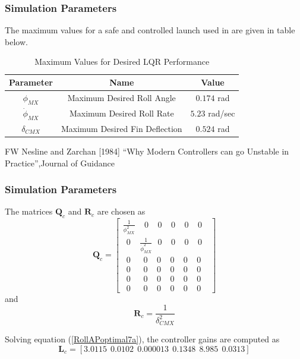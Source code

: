 \documentclass[10pt]{beamer}
\begin{document}
\begin{frame}
\frametitle{Simulation Parameters}
The maximum values for a safe and controlled launch used in \cite{zarchannesline1984} are given in table below.

\begin{table}[!t]
\renewcommand{\arraystretch}{1.6}
\caption{Maximum Values for Desired LQR Performance}
\label{table_rollAPlqr}
\centering
\begin{tabular}{|c||c| |c|}
\hline
Parameter & Name & Value\\
\hline
$\phi_{MX}$ & Maximum Desired Roll Angle & $0.174$ rad\\
\hline
$\dot \phi_{MX}$ & Maximum Desired Roll Rate & $5.23$ rad/sec\\
\hline
$\delta_{CMX}$ & Maximum Desired Fin Deflection & $0.524$ rad\\
\hline
\end{tabular}
\end{table}
\vspace{.5cm}
\footnoterule
\tiny {\cite{zarchannesline1984} FW Nesline and Zarchan [1984] ``Why Modern Controllers can go Unstable in Practice'',Journal of Guidance}
\end{frame}
\begin{frame}
\frametitle{Simulation Parameters}
The matrices $\textbf{Q}_c$ and $\textbf{R}_c$ are chosen as
\begin{equation}
\textbf{Q}_c=\begin{bmatrix}\frac{1}{\phi_{MX}^2}~~~~~0~~~~~0~~~~~0~~~~~0~~~~~0~~~\\
~~0~~~~~\frac{1}{\dot \phi_{MX}^2}~~~0~~~~~0~~~~~0~~~~~0~~~\\
~~0~~~~~~~0~~~~~0~~~~~0~~~~~0~~~~~0~~~\\
~~0~~~~~~~0~~~~~0~~~~~0~~~~~0~~~~~0~~~\\
~~0~~~~~~~0~~~~~0~~~~~0~~~~~0~~~~~0~~~\\
~~0~~~~~~~0~~~~~0~~~~~0~~~~~0~~~~~0~~~\end{bmatrix}\label{RollAPoptimal22}
\end{equation}
and
\begin{equation}
\textbf{R}_c=\frac{1}{\delta_{CMX}^2}\label{RollAPoptimal23}
\end{equation}

Solving equation (\ref{RollAPoptimal7a}), the controller gains are computed as $$\textbf{L}_c=[3.0115~~0.0102~~0.000013~~0.1348~~8.985~~0.0313]$$

\end{frame}
\end{document}
